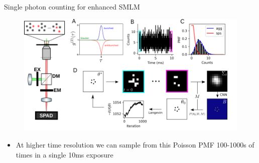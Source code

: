 \documentclass{beamer}					%
\begin{document}
\begin{frame}{Single photon counting for enhanced SMLM}
\begin{figure}
\includegraphics[width=\textwidth]{SPAD.png}
\end{figure}
\begin{itemize}
\item At higher time resolution we can sample from this Poisson PMF 100-1000s of times in a single 10ms exposure
\end{itemize}
\end{frame}

\end{document}
